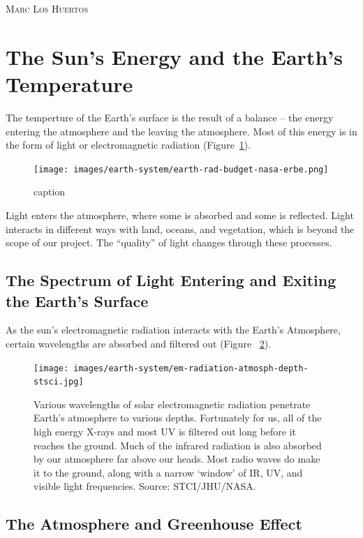 \documentclass{book}\usepackage{knitr}
\makeatletter
\newcommand{\chapterauthor}[1]{%
  {\parindent0pt\vspace*{-25pt}%
  \linespread{1.1}\large\scshape#1%
  \par\nobreak\vspace*{35pt}}
  \@afterheading%
}
\makeatother
\begin{document}
\chapterauthor{Marc Los Huertos}

\section{The Sun's Energy and the Earth's Temperature}

The temperture of the Earth's surface is the result of a balance -- the energy entering the atmosphere and the leaving the atmosphere. Most of this energy is in the form of light or electromagnetic radiation (Figure~\ref{fig:earthbudget}). 

\begin{figure}
\texttt{[image: images/earth-system/earth-rad-budget-nasa-erbe.png]}
\caption{caption}
\label{fig:earthbudget}
\end{figure}

Light enters the atmosphere, where some is absorbed and some is reflected. Light interacts in different ways with land, oceans, and vegetation, which is beyond the scope of our project. The ``quality'' of light changes through these processes. 

\subsection{The Spectrum of Light Entering and Exiting the Earth's Surface}

As the sun's electromagnetic radiation interacts with the Earth's Atmosphere, certain wavelengths are absorbed and filtered out (Figure~ \ref{fig:em-entering}).

\begin{figure}
\texttt{[image: images/earth-system/em-radiation-atmosph-depth-stsci.jpg]}
\caption{Various wavelengths of solar electromagnetic radiation penetrate Earth's atmosphere to various depths. Fortunately for us, all of the high energy X-rays and most UV is filtered out long before it reaches the ground. Much of the infrared radiation is also absorbed by our atmosphere far above our heads. Most radio waves do make it to the ground, along with a narrow `window' of IR, UV, and visible light frequencies. Source: STCI/JHU/NASA.}
\label{fig:em-entering}
\end{figure}

\subsection{The Atmosphere and Greenhouse Effect}
\end{document}
